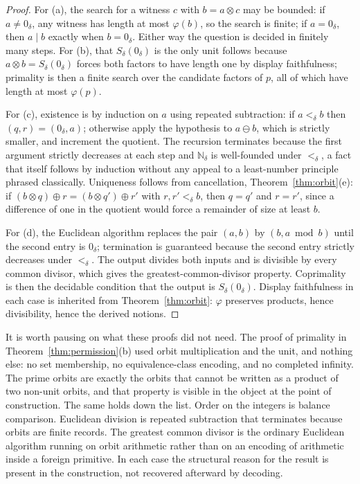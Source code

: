 \documentclass[11pt,a4paper]{article}
\theoremstyle{definition}
\theoremstyle{remark}
\newcommand{\Nd}{\mathbb{N}_\delta}
\newcommand{\Sd}{S_\delta}
\newcommand{\zd}{0_\delta}
\newcommand{\oad}{\oplus}
\newcommand{\omd}{\otimes}
\begin{document}
\begin{proof}
For (a), the search for a witness $c$ with $b = a \omd c$ may be bounded: if
$a \neq \zd$, any witness has length at most $\varphi(b)$, so the search is
finite; if $a = \zd$, then $a \mid b$ exactly when $b = \zd$. Either way the
question is decided in finitely many steps. For (b), that $\Sd(\zd)$ is the only
unit follows because $a \omd b = \Sd(\zd)$ forces both factors to have length
one by display faithfulness; primality is then a finite search over the
candidate factors of $p$, all of which have length at most $\varphi(p)$.

For (c), existence is by induction on $a$ using repeated subtraction: if
$a <_\delta b$ then $(q, r) = (\zd, a)$; otherwise apply the hypothesis to
$a \ominus b$, which is strictly smaller, and increment the quotient. The
recursion terminates because the first argument strictly decreases at each step
and $\Nd$ is well-founded under $<_\delta$, a fact that itself follows by
induction without any appeal to a least-number principle phrased classically.
Uniqueness follows from cancellation, Theorem~\ref{thm:orbit}(e): if
$(b \omd q) \oad r = (b \omd q') \oad r'$ with $r, r' <_\delta b$, then
$q = q'$ and $r = r'$, since a difference of one in the quotient would force a
remainder of size at least $b$.

For (d), the Euclidean algorithm replaces the pair $(a, b)$ by $(b, a \bmod b)$
until the second entry is $\zd$; termination is guaranteed because the second
entry strictly decreases under $<_\delta$. The output divides both inputs and is
divisible by every common divisor, which gives the greatest-common-divisor
property. Coprimality is then the decidable condition that the output is
$\Sd(\zd)$. Display faithfulness in each case is inherited from
Theorem~\ref{thm:orbit}: $\varphi$ preserves products, hence divisibility, hence
the derived notions.
\end{proof}

It is worth pausing on what these proofs did not need. The proof of primality in
Theorem~\ref{thm:permission}(b) used orbit multiplication and the unit, and
nothing else: no set membership, no equivalence-class encoding, and no completed
infinity. The prime orbits are exactly the orbits that cannot be written as a
product of two non-unit orbits, and that property is visible in the object at
the point of construction. The same holds down the list. Order on the integers
is balance comparison. Euclidean division is repeated subtraction that
terminates because orbits are finite records. The greatest common divisor is the
ordinary Euclidean algorithm running on orbit arithmetic rather than on an
encoding of arithmetic inside a foreign primitive. In each case the structural
reason for the result is present in the construction, not recovered afterward by
decoding.
\end{document}

